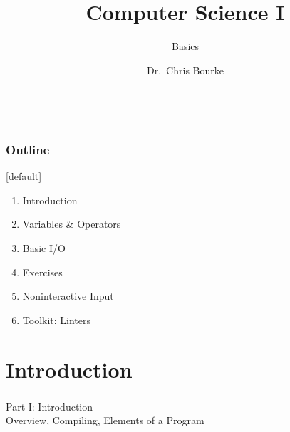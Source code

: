 \documentclass[]{beamer}
\title[~]{Computer Science I}
\subtitle{Basics}
\author[~]{Dr.\ Chris Bourke\\ \email{cbourke@cse.unl.edu}} %
\date{~}
\begin{document}
\begin{frame}
  \titlepage
\end{frame}


\begin{frame}
  \frametitle{Outline}

[default]
\begin{enumerate}
  \item Introduction
  \item Variables \& Operators
  \item Basic I/O
  \item Exercises
  \item Noninteractive Input
  \item Toolkit: Linters
\end{enumerate}

\end{frame}

\section{Introduction}

\begin{frame}
    \frametitle{}
    \framesubtitle{}
    
    \begin{center}
    {\Huge Part I: Introduction}\\
    {\Large Overview, Compiling, Elements of a Program}
    \end{center}

\end{frame}
\end{document}
